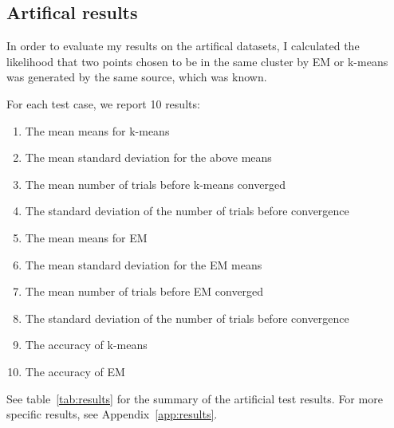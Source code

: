 \documentclass{journal}
\begin{document}
\subsection{Artifical results}
In order to evaluate my results on the artifical datasets, I calculated the
likelihood that two points chosen to be in the same cluster by EM or k-means
was generated by the same source, which was known.

For each test case, we report 10 results:
\begin{enumerate}
    \itemsep0em
    \item{The mean means for k-means}
	\item{The mean standard deviation for the above means}
    \item{The mean number of trials before k-means converged}
	\item{The standard deviation of the number of trials before convergence}

	\item{The mean means for EM}
	\item{The mean standard deviation for the EM means}
	\item{The mean number of trials before EM converged}
	\item{The standard deviation of the number of trials before convergence}

	\item{The accuracy of k-means}
	\item{The accuracy of EM}
\end{enumerate}

See table~\ref{tab:results} for the summary of the
artificial test results. For more specific results, see
Appendix~\ref{app:results}.
\end{document}
